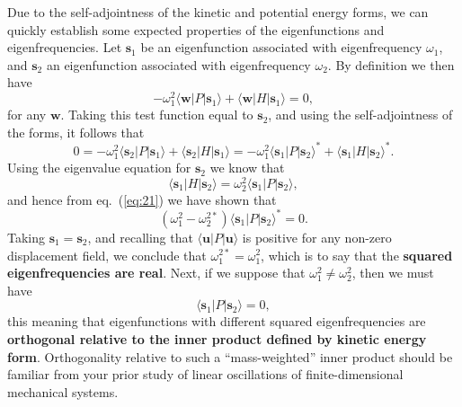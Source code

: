 Due to the self-adjointness of the kinetic and potential energy forms, we can quickly establish some expected properties of the
 eigenfunctions and eigenfrequencies. Let $\mathbf{s}_{1}$ be an eigenfunction associated with eigenfrequency $\omega_{1}$,
  and $\mathbf{s}_{2}$ an eigenfunction associated with eigenfrequency $\omega_{2}$. By definition we then have
\begin{equation}
-\omega_{1}^{2}\langle \mathbf{w}|P|\mathbf{s}_{1}\rangle+\langle \mathbf{w}|H|\mathbf{s}_{1}\rangle=0,
\label{eq:20}
\end{equation}
for any $\mathbf{w}$. Taking this test function equal to $\mathbf{s}_{2}$, and using the self-adjointness of the forms, it follows that
\begin{equation}
0=-\omega_{1}^{2}\langle \mathbf{s}_{2}|P|\mathbf{s}_{1}\rangle+\langle \mathbf{s}_{2}|H|\mathbf{s}_{1}\rangle=
-\omega_{1}^{2}\langle \mathbf{s}_{1}|P|\mathbf{s}_{2}\rangle^{*}+\langle \mathbf{s}_{1}|H|\mathbf{s}_{2}\rangle^{*}.
\label{eq:21}
\end{equation}
Using the eigenvalue equation for $\mathbf{s}_{2}$ we know that
\begin{equation}
\langle \mathbf{s}_{1}|H|\mathbf{s}_{2}\rangle=\omega_{2}^{2}\langle \mathbf{s}_{1}|P|\mathbf{s}_{2}\rangle,
\label{eq:22}
\end{equation}
and hence from eq.~(\ref{eq:21}) we have shown that
\begin{equation}
(\omega_{1}^{2}-\omega_{2}^{2*})\langle \mathbf{s}_{1}|P|\mathbf{s}_{2}\rangle^{*}=0.
\label{eq:23}
\end{equation}
Taking $\mathbf{s}_{1}=\mathbf{s}_{2}$, and recalling that $\langle \mathbf{u}|P|\mathbf{u}\rangle$ is positive for any non-zero displacement field, 
we conclude that $\omega_{1}^{2*}=\omega_{1}^{2}$, which is to say that the \textbf{squared eigenfrequencies are real}. Next, if
 we suppose that $\omega_{1}^{2}\ne\omega_{2}^{2}$, then we must have
\begin{equation}
\langle \mathbf{s}_{1}|P|\mathbf{s}_{2}\rangle=0,
\label{eq:24}
\end{equation}
this meaning that eigenfunctions with different squared eigenfrequencies are \textbf{orthogonal relative to the inner
 product defined by kinetic energy form}. Orthogonality relative to such a ``mass-weighted'' inner product should be
familiar from your prior study of linear oscillations of finite-dimensional mechanical systems.

